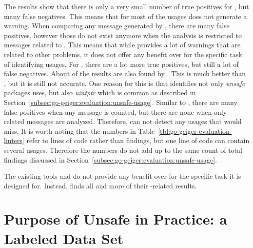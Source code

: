 

The results show that there is only a very small number of true positives for \toolVet{}, but many false negatives.
This means that for most of the \unsafe{} usages \toolVet{} does not generate a warning.
When comparing any message generated by \toolVet{}, there are many false positives, however those do not exist anymore
when the analysis is restricted to \toolVet{} messages related to \unsafe{}.
This means that while \toolVet{} provides a lot of warnings that are related to other problems, it does not offer any
benefit over \toolGeiger{} for the specific task of identifying \unsafe{} usages.
For \toolGosec{}, there are a lot more true positives, but still a lot of false negatives.
About  of the \toolGeiger{} results are also found by \toolGosec{}.
This is much better than \toolVet{}, but it is still not accurate.
One reason for this is that \toolGeiger{} identifies not only \textit{unsafe} packages uses, but also \textit{uintptr}
which is common as described in Section~\ref{subsec:go-geiger:evaluation:unsafe-usage}.
Similar to \toolVet{}, there are many false positives when any \toolGosec{} message is counted, but there are none when
only \unsafe{}-related messages are analyzed.
Therefore, \toolGosec{} can not detect any usages that \toolGeiger{} would miss.
It is worth noting that the numbers in Table~\ref{tbl:go-geiger-evaluation-linters} refer to lines of code rather than
\unsafe{} findings, but one line of code can contain several \unsafe{} usages.
Therefore the numbers do not add up to the same count of total findings discussed in
Section~\ref{subsec:go-geiger:evaluation:unsafe-usage}.

\begin{answerToRQ}[\ref{rq:linterComparison}]
    The existing tools \toolVet{} and \toolGosec{} do not provide any benefit over \toolGeiger{} for the specific task
    it is designed for.
    Instead, \toolGeiger{} finds all and more of their \unsafe{}-related results.
\end{answerToRQ}



\section{Purpose of Unsafe in Practice: a Labeled Data Set}\label{sec:go-geiger:labeled-dataset}

